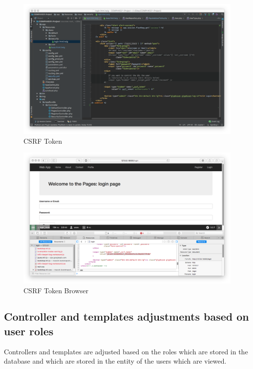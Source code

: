 \begin{figure}[htbp]
   \centering
   \includegraphics[width=400pt]{figures/csrf_token.png} %
   \caption{CSRF Token}
   \label{fig:CSRF Token}
\end{figure}

\begin{figure}[htbp]
   \centering
   \includegraphics[width=400pt]{figures/csrf_token_element.png} %
   \caption{CSRF Token Browser}
   \label{fig:CSRF Token Browser}
\end{figure}

\subsection{Controller and templates adjustments based on user roles}

Controllers and templates are adjusted based on the roles which are stored in the database and which are stored in the entity of the users which are viewed.

